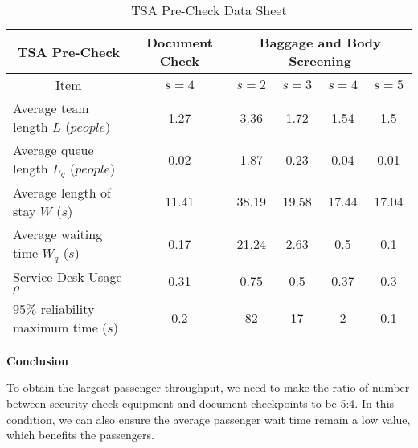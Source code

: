 \documentclass{mcmthesis}
\begin{document}
\begin{table}[h]
\centering
\caption{TSA Pre-Check Data Sheet}
\label{Modification 3-2}
\begin{tabular}{@{}l|c|cccc@{}}
\toprule
\multicolumn{1}{c|}{TSA Pre-Check}    & Document Check & \multicolumn{4}{c}{Baggage and Body Screening} \\ \midrule
\multicolumn{1}{c|}{Item}             & $s=4$          & $s=2$      & $s=3$      & $s=4$     & $s=5$     \\ \midrule
Average team length $L$ ($people$)    & 1.27           & 3.36       & 1.72       & 1.54      & 1.5       \\
Average queue length $L_q$ ($people$) & 0.02           & 1.87       & 0.23       & 0.04      & 0.01      \\
Average length of stay $W$ ($s$)      & 11.41          & 38.19      & 19.58      & 17.44     & 17.04     \\
Average waiting time $W_q$ ($s$)      & 0.17           & 21.24      & 2.63       & 0.5       & 0.1       \\
Service Desk Usage $\rho$             & 0.31           & 0.75       & 0.5        & 0.37      & 0.3       \\
$95\%$ reliability maximum time ($s$) & 0.2            & 82         & 17         & 2         & 0.1       \\ \bottomrule
\end{tabular}
\end{table}
\par \textbf{Conclusion}
\par To obtain the largest passenger throughput, we need to make the ratio of number between security check equipment and document checkpoints to be 5:4. In this condition, we can also ensure the average passenger wait time remain a low value, which benefits the passengers.
\end{document}
